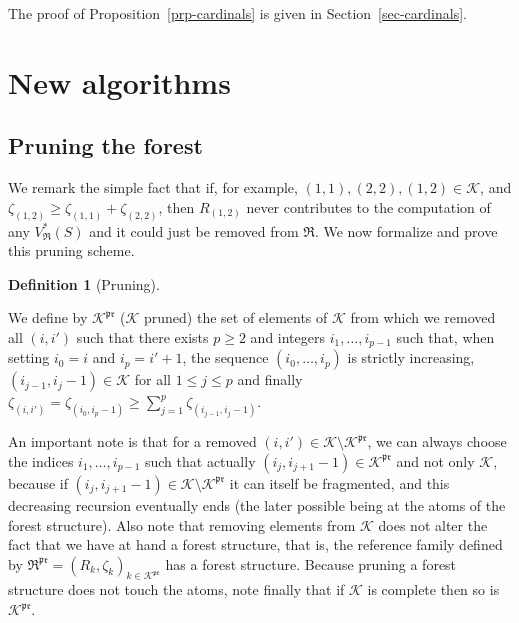 \documentclass[
  11pt,
  a4paper,
]{article}
\theoremstyle{plain}
\theoremstyle{definition}
\theoremstyle{plain}
\theoremstyle{definition}
\newtheorem{definition}{Definition}[section]
\theoremstyle{plain}
\theoremstyle{remark}
\begin{document}
The proof of Proposition~\ref{prp-cardinals} is given in
Section~\ref{sec-cardinals}.

\section{New algorithms}\label{new-algorithms}

\subsection{Pruning the forest}\label{sec-pruning}

We remark the simple fact that if, for example,
\((1,1), (2,2), (1,2)\in\mathcal{K}\), and
\(\zeta_{(1,2)}\geq \zeta_{(1,1)}+\zeta_{(2,2)}\), then \(R_{(1,2)}\)
never contributes to the computation of any \(V^*_{\mathfrak{R}}(S)\)
and it could just be removed from \(\mathfrak{R}\). We now formalize and
prove this pruning scheme.

\begin{definition}[Pruning]\protect\hypertarget{def-pruning}{}\label{def-pruning}

We define by \(\mathcal{K}^{\mathfrak{pr}}\) (\(\mathcal{K}\) pruned)
the set of elements of \(\mathcal{K}\) from which we removed all
\((i,i')\) such that there exists \(p\geq2\) and integers
\(i_1,\dotsc,i_{p-1}\) such that, when setting \(i_0=i\) and
\(i_{p}=i'+1\), the sequence \((i_0,\dotsc,i_{p})\) is strictly
increasing, \((i_{j-1},i_{j}-1)\in\mathcal{K}\) for all
\(1\leq j\leq p\) and finally
\(\zeta_{(i,i')}=\zeta_{(i_0,i_{p}-1)}\geq \sum_{j=1}^{p} \zeta_{(i_{j-1}, i_{j}-1)}\).

\end{definition}

An important note is that for a removed
\((i,i')\in\mathcal{K}\setminus\mathcal{K}^{\mathfrak{pr}}\), we can
always choose the indices \(i_1,\dotsc,i_{p-1}\) such that actually
\((i_j,i_{j+1}-1)\in\mathcal{K}^{\mathfrak{pr}}\) and not only
\(\mathcal{K}\), because if
\((i_j,i_{j+1}-1)\in\mathcal{K}\setminus\mathcal{K}^{\mathfrak{pr}}\) it
can itself be fragmented, and this decreasing recursion eventually ends
(the later possible being at the atoms of the forest structure). Also
note that removing elements from \(\mathcal{K}\) does not alter the fact
that we have at hand a forest structure, that is, the reference family
defined by
\(\mathfrak{R}^{\mathfrak{pr}}=(R_k,\zeta_k)_{k\in\mathcal{K}^{\mathfrak{pr}}}\)
has a forest structure. Because pruning a forest structure does not
touch the atoms, note finally that if \(\mathcal{K}\) is complete then
so is \(\mathcal{K}^{\mathfrak{pr}}\).
\end{document}
